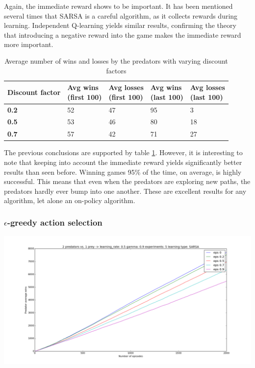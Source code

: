 Again, the immediate reward shows to be important. It has been mentioned several times that SARSA is a careful algorithm, as it collects rewards during learning. Independent Q-learning yields similar results, confirming the theory that introducing a negative reward into the game makes the immediate reward more important.

\begin{table}[H]
\begin{center}
\begin{tabular}{| l | l | l | l | l |}
\hline
\parbox{2cm}{\textbf{Discount factor}} & \parbox{2cm}{\textbf{Avg wins \\ (first 100)}} & \parbox{2cm}{\textbf{Avg losses \\ (first 100)}} & \parbox{2cm}{\textbf{Avg wins \\ (last 100)}} & \parbox{2cm}{\textbf{Avg losses \\ (last 100)}} \\
\hline
\textbf{0.2} & 52 & 47 & 95 & 3 \\
\hline
\textbf{0.5} & 53 & 46 & 80 & 18 \\
\hline
\textbf{0.7} & 57 & 42 & 71 & 27 \\
\hline
\end{tabular}
\caption{Average number of wins and losses by the predators with varying discount factors}
\label{table:sarsadiscountfactor}
\end{center}
\end{table}

The previous conclusions are supported by table \ref{table:sarsadiscountfactor}. However, it is interesting to note that keeping into account the immediate reward yields significantly better results than seen before. Winning games 95\% of the time, on average, is highly successful. This means that even when the predators are exploring new paths, the predators hardly ever bump into one another. These are excellent results for any algorithm, let alone an on-policy algorithm.

\subsubsection{$\epsilon$-greedy action selection}
\begin{center}
	\includegraphics[scale=0.3]{2_predators_epsilon_SARSA}
	\label{graph:sarsagreedy}
\end{center}

